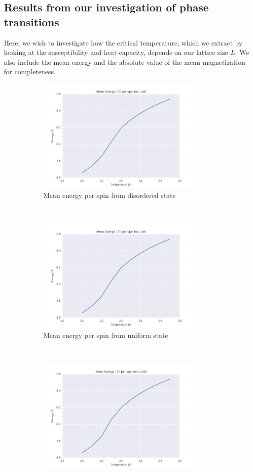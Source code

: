 \documentclass[a4paper, 10pt]{article}
\begin{document}
\subsection{Results from our investigation of phase transitions}
Here, we wish to investigate how the critical temperature, which we extract by looking at the susceptibility and heat capacity, depends on our lattice size $L$. We also include the mean energy and the absolute value of the mean magnetization for completeness. 
\begin{figure}[!ht]
    \centering
    \begin{subfigure}[H!]{0.5\textwidth}
        \centering
        \includegraphics[height=2.2in]{meanEnergyl40Ne5.png}
        \caption{Mean energy per spin from disordered state}
    \end{subfigure}%
    ~ 
    \begin{subfigure}[H!]{0.5\textwidth}
        \centering
        \includegraphics[height=2.2in]{meanEnergyl60Ne5.png}
        \caption{Mean energy per spin from uniform state}
    \end{subfigure}
        ~
     \begin{subfigure}[H!]{0.5\textwidth}
        \centering
        \includegraphics[height=2.2in]{meanEnergyl100Ne5.png}

\end{subfigure}
\end{figure}
\end{document}

